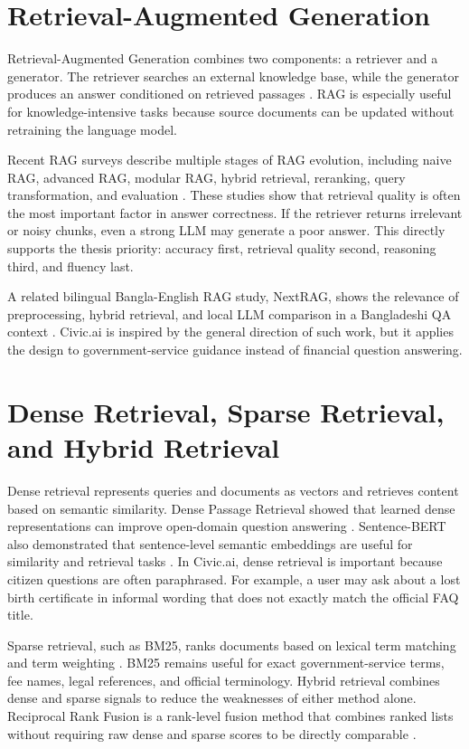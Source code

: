 \documentclass[12pt,oneside,openany]{report}
\begin{document}
\section{Retrieval-Augmented Generation}
Retrieval-Augmented Generation combines two components: a retriever and a generator. The retriever searches an external knowledge base, while the generator produces an answer conditioned on retrieved passages \cite{lewis2020rag}. RAG is especially useful for knowledge-intensive tasks because source documents can be updated without retraining the language model.

Recent RAG surveys describe multiple stages of RAG evolution, including naive RAG, advanced RAG, modular RAG, hybrid retrieval, reranking, query transformation, and evaluation \cite{gao2023rag_survey,gupta2024rag_survey}. These studies show that retrieval quality is often the most important factor in answer correctness. If the retriever returns irrelevant or noisy chunks, even a strong LLM may generate a poor answer. This directly supports the thesis priority: accuracy first, retrieval quality second, reasoning third, and fluency last.

A related bilingual Bangla-English RAG study, NextRAG, shows the relevance of preprocessing, hybrid retrieval, and local LLM comparison in a Bangladeshi QA context \cite{nextrag2025}. Civic.ai is inspired by the general direction of such work, but it applies the design to government-service guidance instead of financial question answering.

\section{Dense Retrieval, Sparse Retrieval, and Hybrid Retrieval}
Dense retrieval represents queries and documents as vectors and retrieves content based on semantic similarity. Dense Passage Retrieval showed that learned dense representations can improve open-domain question answering \cite{karpukhin2020dpr}. Sentence-BERT also demonstrated that sentence-level semantic embeddings are useful for similarity and retrieval tasks \cite{reimers2019sbert}. In Civic.ai, dense retrieval is important because citizen questions are often paraphrased. For example, a user may ask about a lost birth certificate in informal wording that does not exactly match the official FAQ title.

Sparse retrieval, such as BM25, ranks documents based on lexical term matching and term weighting \cite{robertson2009bm25}. BM25 remains useful for exact government-service terms, fee names, legal references, and official terminology. Hybrid retrieval combines dense and sparse signals to reduce the weaknesses of either method alone. Reciprocal Rank Fusion is a rank-level fusion method that combines ranked lists without requiring raw dense and sparse scores to be directly comparable \cite{cormack2009rrf}.
\end{document}
